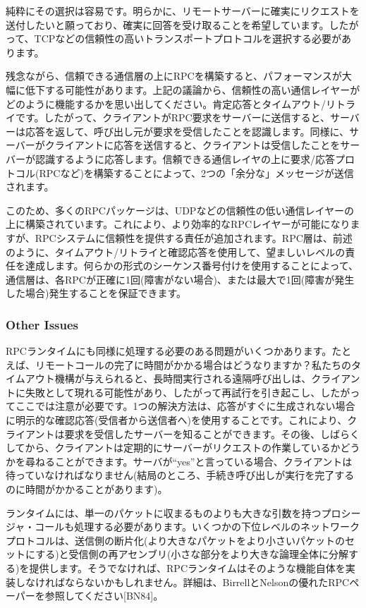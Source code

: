 純粋にその選択は容易です。明らかに、リモートサーバーに確実にリクエストを送付したいと願っており、確実に回答を受け取ることを希望しています。したがって、TCPなどの信頼性の高いトランスポートプロトコルを選択する必要があります。

残念ながら、信頼できる通信層の上にRPCを構築すると、パフォーマンスが大幅に低下する可能性があります。上記の議論から、信頼性の高い通信レイヤーがどのように機能するかを思い出してください。肯定応答とタイムアウト/リトライです。したがって、クライアントがRPC要求をサーバーに送信すると、サーバーは応答を返して、呼び出し元が要求を受信したことを認識します。同様に、サーバーがクライアントに応答を送信すると、クライアントは受信したことをサーバーが認識するように応答します。信頼できる通信レイヤの上に要求/応答プロトコル(RPCなど)を構築することによって、2つの「余分な」メッセージが送信されます。

このため、多くのRPCパッケージは、UDPなどの信頼性の低い通信レイヤーの上に構築されています。これにより、より効率的なRPCレイヤーが可能になりますが、RPCシステムに信頼性を提供する責任が追加されます。RPC層は、前述のように、タイムアウト/リトライと確認応答を使用して、望ましいレベルの責任を達成します。何らかの形式のシーケンス番号付けを使用することによって、通信層は、各RPCが正確に1回(障害がない場合)、または最大で1回(障害が発生した場合)発生することを保証できます。

\hypertarget{other-issues}{%
\subsubsection*{Other Issues}\label{other-issues}}

RPCランタイムにも同様に処理する必要のある問題がいくつかあります。たとえば、リモートコールの完了に時間がかかる場合はどうなりますか？私たちのタイムアウト機構が与えられると、長時間実行される遠隔呼び出しは、クライアントに失敗として現れる可能性があり、したがって再試行を引き起こし、したがってここでは注意が必要です。1つの解決方法は、応答がすぐに生成されない場合に明示的な確認応答(受信者から送信者へ)を使用することです。これにより、クライアントは要求を受信したサーバーを知ることができます。その後、しばらくしてから、クライアントは定期的にサーバーがリクエストの作業しているかどうかを尋ねることができます。サーバが``yes''と言っている場合、クライアントは待っていなければなりません(結局のところ、手続き呼び出しが実行を完了するのに時間がかかることがあります)。

ランタイムには、単一のパケットに収まるものよりも大きな引数を持つプロシージャ・コールも処理する必要があります。いくつかの下位レベルのネットワークプロトコルは、送信側の断片化(より大きなパケットをより小さいパケットのセットにする)と受信側の再アセンブリ(小さな部分をより大きな論理全体に分解する)を提供します。そうでなければ、RPCランタイムはそのような機能自体を実装しなければならないかもしれません。詳細は、BirrellとNelsonの優れたRPCペーパーを参照してください{[}BN84{]}。

